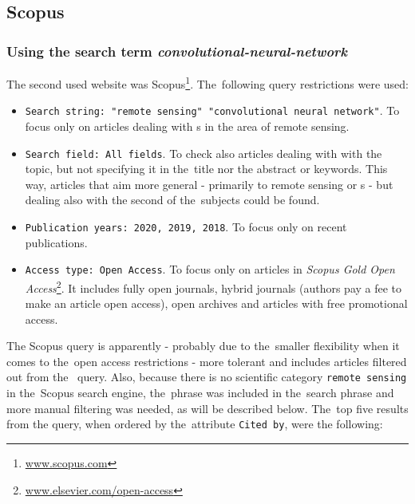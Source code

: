 \subsection{Scopus}
\label{scopus-papers}

\subsubsection{Using the search term \textit{convolutional-neural-network}}
\label{scopus-papers-full-length}

The second used website was Scopus\footnote{\url{www.scopus.com}}. The~following query restrictions were used:

\begin{itemize}
	\item \verb|Search string: "remote sensing" "convolutional neural network"|. To focus only on articles dealing with s in the area of remote sensing.
	\item \verb|Search field: All fields|. To check also articles dealing with with the topic, but not specifying it in the~title nor the abstract or keywords. This way, articles that aim more general - primarily to remote sensing or s - but dealing also with the second of the~subjects could be found.
	\item \verb|Publication years: 2020, 2019, 2018|. To focus only on recent publications.
	\item \verb|Access type: Open Access|. To focus only on articles in \textit{Scopus Gold Open Access}\footnote{\url{www.elsevier.com/open-access}}. It includes fully open journals, hybrid journals (authors pay a fee to make an article open access), open archives and articles with free promotional access.
\end{itemize}

\noindent The Scopus query is apparently - probably due to the~smaller flexibility when it comes to the~open access restrictions - more tolerant and includes articles filtered out from the~ query. Also, because there is no scientific category \verb|remote sensing| in the~Scopus search engine, the~phrase was included in the~search phrase and more manual filtering was needed, as will be described below. The~top five results from the query, when ordered by the~attribute \verb|Cited by|, were the following:

